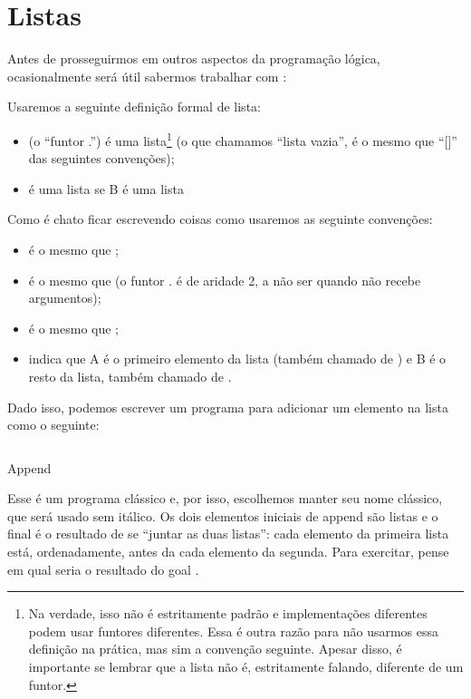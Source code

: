 \documentclass{article}
\begin{document}
\section{Listas}

Antes de prosseguirmos em outros aspectos da programação lógica,
ocasionalmente será útil sabermos trabalhar com :

\begin{definition}
  Usaremos a seguinte definição formal de lista:
  \begin{itemize}
    \item {} (o ``funtor .'') é uma lista\footnote{Na
      verdade, isso não é estritamente padrão e implementações
      diferentes podem usar funtores diferentes. Essa é outra razão
      para não usarmos essa definição na prática, mas sim a convenção
      seguinte. Apesar disso, é importante se lembrar que a lista não
      é, estritamente falando, diferente de um funtor.} (o que
      chamamos ``lista vazia'', é o mesmo que ``[]'' das seguintes
      convenções);
    \item {} é uma lista se B é uma lista
  \end{itemize}
  Como é chato ficar escrevendo coisas como 
  usaremos as seguinte convenções:
  \begin{itemize}
    \item \codigo{[A,B]} é o mesmo que ;
    \item \codigo{[A]} é o mesmo que  (o funtor . é
      de aridade 2, a não ser quando não recebe argumentos);
    \item \codigo{[A, B, C, ...]} é o mesmo que ;
    \item \codigo{[A|B]} indica que A é o primeiro elemento da lista
      (também chamado de ) e B é o resto da
      lista, também chamado de  .
  \end{itemize}
\end{definition}

Dado isso, podemos escrever um programa para adicionar um elemento na
lista como o seguinte:

\begin{listing}[ht]
  \inputminted{prolog}{../Exemplos/Cap2/prog2_append.pl}
  \caption{Append}\label{lst:append}
\end{listing}

Esse é um programa clássico e, por isso, escolhemos manter seu nome
clássico, que será usado sem itálico. Os dois
elementos iniciais de append são listas e o final é o resultado de se
``juntar as duas listas'': cada elemento da primeira lista está,
ordenadamente, antes da cada elemento da segunda. Para exercitar,
pense em qual seria o resultado do goal .
\end{document}
